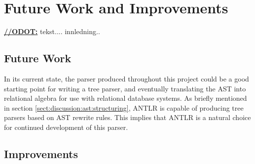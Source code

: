 \chapter{Future Work and Improvements}
\label{sect:summary:future_work}
\underline{\textbf{\LARGE //ODOT:}} tekst.... innledning..


\section{Future Work}

In its current state, the parser produced throughout this project could be a good
starting point for writing a tree parser, and eventually translating the AST
into relational algebra for use with relational database systems. As briefly
mentioned in section \ref{sect:discussion:ast:structuring}, ANTLR is capable of
producing tree parsers based on AST rewrite rules. This implies that ANTLR is a
natural choice for continued development of this parser.



\section{Improvements}
\label{sect:future:improvements}


